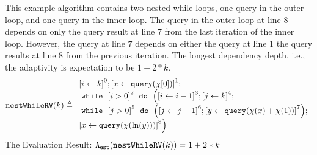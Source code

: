     \begin{example}
        \label{ex:nestedWhileRV}
        This example algorithm contains two nested while loops, one query in the outer loop, and one query in the inner loop.
        The query in the outer loop at line $8$ depends on only the query result at line $7$
        from the last iteration of the inner loop.
        However, the query at line $7$ depends on  either the query at line $1$ 
        the query results at line $8$ from the previous iteration.
        The longest dependency depth, i.e., the adaptivity is expectation to be $1 + 2 * k $.
        \[
            \kw{nestWhileRV}(k) \triangleq 
        \begin{array}{l}
            \clabel{ \assign{i}{k} }^{0} ; 
            \clabel{\assign{x}{\query(\chi[0])}}^{1} ; \\
   \ewhile ~ \clabel{i > 0}^{2} ~ \edo ~ 
   \Big(
    \clabel{\assign{i}{i-1}}^{3} ;
    \clabel{\assign{j}{k}}^{4} ;\\
    \ewhile ~ \clabel{j > 0}^{5} ~ \edo ~ 
    \Big(
     \clabel{\assign{j}{j-1}}^{6};
     \clabel{\assign{y}{\query(\chi(x) + \chi(1))} }^{7}
     \Big); \\
    \clabel{\assign{x}{\query(\chi(\ln(y)))} }^{8}
     \Big)
            \end{array}
        \]
        The Evaluation Result: $ {\mathtt{A_{est}}}(\mathtt{nestWhileRV}(k)) = 1 + 2 * k $
    \end{example}
%
   
